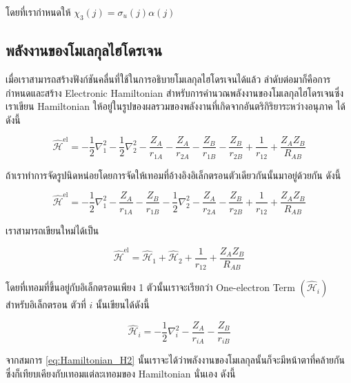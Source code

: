 \noindent โดยที่เรากำหนดให้ $\chi_3(j) = \sigma_u(j) \alpha(j)$

\subsection{พลังงานของโมเลกุลไฮโดรเจน}

เมื่อเราสามารถสร้างฟังก์ชันคลื่นที่ใช้ในการอธิบายโมเลกุลไฮโดรเจนได้แล้ว ลำดับต่อมาก็คือการกำหนดและสร้าง Electronic Hamiltonian
สำหรับการคำนวณพลังงานของโมเลกุลไฮโดรเจนซึ่งเราเขียน Hamiltonian ให้อยู่ในรูปของผลรวมของพลังงานที่เกิดจากอันตริกิริยาระหว่างอนุภาค%
ได้ดังนี้

\begin{equation}
    \label{eq:Hamiltonian_H2}
    \hat{\mathscr{H}}^{\mathrm{el}}
    =
    -\frac{1}{2} \nabla_1^2
    -\frac{1}{2} \nabla_2^2
    -\frac{Z_A}{r_{1 A}}
    -\frac{Z_A}{r_{2 A}}
    -\frac{Z_B}{r_{1 B}}
    -\frac{Z_B}{r_{2 B}}
    +\frac{1}{r_{12}}
    +\frac{Z_A Z_B}{R_{A B}}
\end{equation}

\noindent ถ้าเราทำการจัดรูปนิดหน่อยโดยการจัดให้เทอมที่อ้างอิงอิเล็กตรอนตัวเดียวกันนั้นมาอยู่ด้วยกัน ดังนี้

\begin{equation}
    \hat{\mathscr{H}}^{\mathrm{el}}
    =
    -\frac{1}{2} \nabla_1^2
    -\frac{Z_A}{r_{1 A}}
    -\frac{Z_B}{r_{1 B}}
    -\frac{1}{2} \nabla_2^2
    -\frac{Z_A}{r_{2 A}}
    -\frac{Z_B}{r_{2 B}}
    +\frac{1}{r_{12}}
    +\frac{Z_A Z_B}{R_{A B}}
\end{equation}

\noindent เราสามารถเขียนใหม่ได้เป็น

\begin{equation}
    \label{eq:Hamiltonian_H2_simple}
    \hat{\mathscr{H}}^{\mathrm{el}}
    =
    \hat{\mathscr{H}}_1
    + \hat{\mathscr{H}}_2
    + \frac{1}{r_{12}}
    + \frac{Z_A Z_B}{R_{A B}}
\end{equation}

\noindent โดยที่เทอมที่ขึ้นอยู่กับอิเล็กตรอนเพียง 1 ตัวนั้นเราจะเรียกว่า One-electron Term $(\hat{\mathscr{H}}_i)$ สำหรับอิเล็กตรอน%
ตัวที่ $i$ นั้นเขียนได้ดังนี้

\begin{equation}
    \hat{\mathscr{H}}_i
    =
    -\frac{1}{2} \nabla_i^2
    -\frac{Z_A}{r_{i A}}
    -\frac{Z_B}{r_{i B}}
\end{equation}

จากสมการ \eqref{eq:Hamiltonian_H2} นั้นเราจะได้ว่าพลังงานของโมเลกุลนั้นก็จะมีหน้าตาที่คล้ายกันซึ่งก็เทียบเคียงกับเทอมแต่ละเทอมของ
Hamiltonian นั่นเอง ดังนี้


